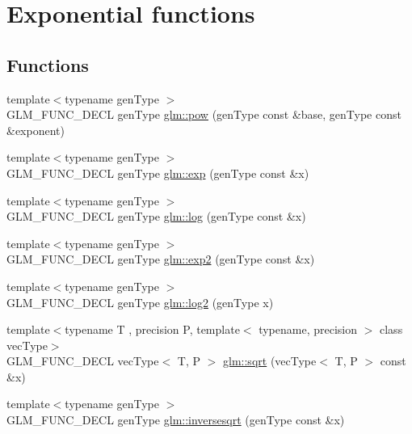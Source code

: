 \hypertarget{group__core__func__exponential}{\section{Exponential functions}
\label{group__core__func__exponential}
}
\subsection*{Functions}
\begin{DoxyCompactItemize}
\item 
{\footnotesize template$<$typename gen\-Type $>$ }\\G\-L\-M\-\_\-\-F\-U\-N\-C\-\_\-\-D\-E\-C\-L gen\-Type \hyperlink{group__core__func__exponential_ga1ce4b2fddd26d0d3a35a8d98f37f3ac0}{glm\-::pow} (gen\-Type const \&base, gen\-Type const \&exponent)
\item 
{\footnotesize template$<$typename gen\-Type $>$ }\\G\-L\-M\-\_\-\-F\-U\-N\-C\-\_\-\-D\-E\-C\-L gen\-Type \hyperlink{group__core__func__exponential_gae154699ba6bda068d4b87cf9b987381f}{glm\-::exp} (gen\-Type const \&x)
\item 
{\footnotesize template$<$typename gen\-Type $>$ }\\G\-L\-M\-\_\-\-F\-U\-N\-C\-\_\-\-D\-E\-C\-L gen\-Type \hyperlink{group__core__func__exponential_ga0c8da2d2921da250e8700ac4476916a1}{glm\-::log} (gen\-Type const \&x)
\item 
{\footnotesize template$<$typename gen\-Type $>$ }\\G\-L\-M\-\_\-\-F\-U\-N\-C\-\_\-\-D\-E\-C\-L gen\-Type \hyperlink{group__core__func__exponential_gac45997fb3ac907cad408d6da0a0f5f54}{glm\-::exp2} (gen\-Type const \&x)
\item 
{\footnotesize template$<$typename gen\-Type $>$ }\\G\-L\-M\-\_\-\-F\-U\-N\-C\-\_\-\-D\-E\-C\-L gen\-Type \hyperlink{group__core__func__exponential_gad41e336e9bc8190fe99d2cfd9261c19b}{glm\-::log2} (gen\-Type x)
\item 
{\footnotesize template$<$typename T , precision P, template$<$ typename, precision $>$ class vec\-Type$>$ }\\G\-L\-M\-\_\-\-F\-U\-N\-C\-\_\-\-D\-E\-C\-L vec\-Type$<$ T, P $>$ \hyperlink{group__core__func__exponential_ga2ea6c6738ad6e09ec3405a628047801b}{glm\-::sqrt} (vec\-Type$<$ T, P $>$ const \&x)
\item 
{\footnotesize template$<$typename gen\-Type $>$ }\\G\-L\-M\-\_\-\-F\-U\-N\-C\-\_\-\-D\-E\-C\-L gen\-Type \hyperlink{group__core__func__exponential_ga5ac08ead2e50ad0295b9ad85a3e449e9}{glm\-::inversesqrt} (gen\-Type const \&x)
\end{DoxyCompactItemize}


